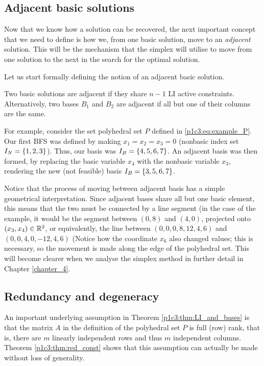 \subsection{Adjacent basic solutions}

Now that we know how a solution can be recovered, the next important concept that we need to define is how we, from one basic solution, move to an \emph{adjacent} solution. This will be the mechanism that the simplex will utilise to move from one solution to the next in the search for the optimal solution.

Let us start formally defining the notion of an adjacent basic solution.
%
\begin{definition}
	Two basic solutions are adjacent if they share $n-1$ LI active constraints. Alternatively, two bases $B_1$ and $B_2$ are adjacent if all but one of their columns are the same.
\end{definition}
%
For example, consider the set polyhedral set $P$ defined in \eqref{p1c3:eq:example_P}. Our first BFS was defined by making $x_1 = x_2 = x_3 = 0$ (nonbasic index set $I_N = \left\{ 1,2,3 \right \}$). Thus, our basis was $I_B = \left\{ 4,5,6,7 \right \}$. An adjacent basis was then formed, by replacing the basic variable $x_4$ with the nonbasic variable $x_3$, rendering the new (not feasible) basis $I_B = \left\{ 3,5,6,7 \right \}$.

Notice that the process of moving between adjacent basis has a simple geometrical interpretation. Since adjacent bases share all but one basic element, this means that the two must be connected by a line segment (in the case of the example, it would be the segment between $(0,8)$ and $(4,0)$, projected onto $(x_3,x_4) \in \mathbb{R}^2$, or equivalently, the line between $(0,0,0,8,12,4,6)$ and $(0,0,4,0,-12,4,6)$ (Notice how the coordinate $x_6$ also changed values; this is necessary, so the movement is made along the edge of the polyhedral set. This will become clearer when we analyse the simplex method in further detail in Chapter \ref{chapter_4}. 



\subsection{Redundancy and degeneracy}

An important underlying assumption in Theorem \ref{p1c3:thm:LI_and_bases} is that the matrix $A$ in the definition of the polyhedral set $P$ is full (row) rank, that is, there are $m$ linearly independent rows and thus $m$ independent columns. Theorem \ref{p1c3:thm:red_const} shows that this assumption can actually be made without loss of generality. 
 
